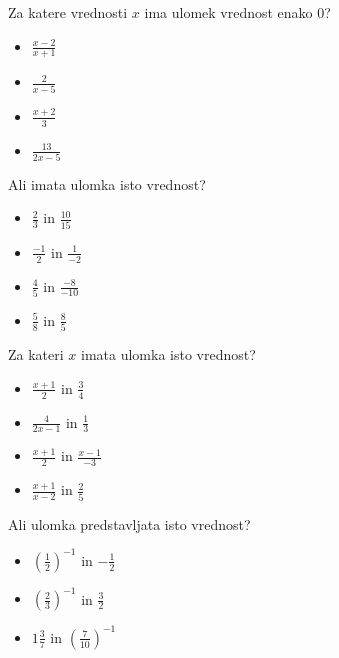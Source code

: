        
            \begin{naloga}
                Za katere vrednosti $x$ ima ulomek vrednost enako $0$?
                \begin{itemize}
                    \item $\frac{x-2}{x+1}$ 
                    \item $\frac{2}{x-5}$ 
                    \item $\frac{x+2}{3}$ 
                    \item $\frac{13}{2x-5}$ 
                \end{itemize}
            \end{naloga}
        

        
            \begin{naloga}
                Ali imata ulomka isto vrednost?
                \begin{itemize}
                    \item $\frac{2}{3}$ in $\frac{10}{15}$ 
                    \item $\frac{-1}{2}$ in $\frac{1}{-2}$ 
                    \item $\frac{4}{5}$ in $\frac{-8}{-10}$ 
                    \item $\frac{5}{8}$ in $\frac{8}{5}$ 
                \end{itemize}
            \end{naloga}
        

        
            \begin{naloga}
                Za kateri $x$ imata ulomka isto vrednost?
                \begin{itemize}
                    \item $\frac{x+1}{2}$ in $\frac{3}{4}$ 
                    \item $\frac{4}{2x-1}$ in $\frac{1}{3}$ 
                    \item $\frac{x+1}{2}$ in $\frac{x-1}{-3}$ 
                    \item $\frac{x+1}{x-2}$ in $\frac{2}{5}$ 
                \end{itemize}
            \end{naloga}
        

        
            \begin{naloga}
                Ali ulomka predstavljata isto vrednost?
                \begin{itemize}
                    \item $\left(\frac{1}{2}\right)^{-1}$ in $-\frac{1}{2}$ 
                    \item $\left(\frac{2}{3}\right)^{-1}$ in $\frac{3}{2}$ 
                    \item $ 1\frac{3}{7}$ in $\left(\frac{7}{10}\right)^{-1}$ 
               \end{itemize}
            \end{naloga}
        

